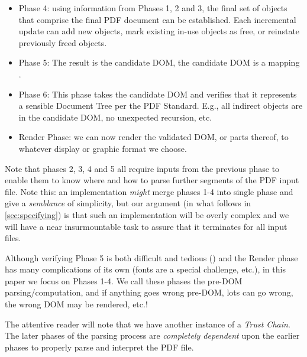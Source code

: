 \begin{itemize}
\item Phase 4: using information from Phases 1, 2 and 3, the final set of objects that comprise the final PDF document can be established. Each incremental update can add new objects, mark existing in-use objects as free, or reinstate previously freed objects.  
\item Phase 5:  The result is the candidate DOM, 
  the candidate DOM is a mapping .
\item Phase 6: This phase takes the candidate DOM and verifies that
  it represents a sensible Document Tree per the PDF Standard.  E.g.,
  all indirect objects are in the candidate DOM, no unexpected recursion,
  etc.
\item Render Phase: we can now render the validated DOM, or parts thereof, to
  whatever display or graphic format we choose.
\end{itemize}

Note that phases 2, 3, 4 and 5
all require inputs from the previous phase to enable them to know where and
how to parse further segments of the PDF input file.
%
Note this: an implementation \emph{might} merge phases 1-4 into single phase
and give a \emph{semblance} of simplicity, but our argument (in what
follows in \cref{sec:specifying}) is that such an implementation will be
overly complex and we will have a near insurmountable task to assure that it
terminates for all input files.


Although verifying Phase 5 is both difficult and tedious
()
and the Render phase has many complications of its own (fonts are
a special challenge, etc.), in this paper we focus on Phases 1-4.
We call these phases the pre-DOM parsing/computation, and if anything
goes wrong pre-DOM, lots can go wrong, the wrong DOM may be rendered, etc.!


The attentive reader will note that we have another instance of a \emph{Trust
Chain}.  The later phases of the parsing process are \emph{completely
dependent} upon the earlier phases to properly parse and interpret the PDF
file.

